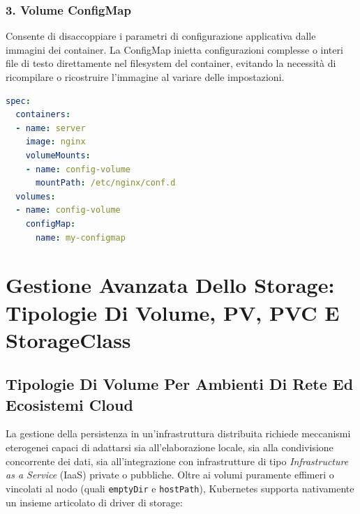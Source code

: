 \documentclass[11pt, a4paper]{article}
\begin{document}
\subsubsection{3. Volume ConfigMap}
Consente di disaccoppiare i parametri di configurazione applicativa dalle immagini dei container. La ConfigMap inietta configurazioni complesse o interi file di testo direttamente nel filesystem del container, evitando la necessità di ricompilare o ricostruire l'immagine al variare delle impostazioni.
\begin{lstlisting}[language=yaml, caption={Dichiarazione e montaggio di un volume basato su \texttt{configMap}.}]
spec:
  containers:
  - name: server
    image: nginx
    volumeMounts:
    - name: config-volume
      mountPath: /etc/nginx/conf.d
  volumes:
  - name: config-volume
    configMap:
      name: my-configmap
\end{lstlisting}


\section{Gestione Avanzata Dello Storage: Tipologie Di Volume, PV, PVC E StorageClass}

\subsection{Tipologie Di Volume Per Ambienti Di Rete Ed Ecosistemi Cloud}
La gestione della persistenza in un'infrastruttura distribuita richiede meccanismi eterogenei capaci di adattarsi sia all'elaborazione locale, sia alla condivisione concorrente dei dati, sia all'integrazione con infrastrutture di tipo \emph{Infrastructure as a Service} (IaaS) private o pubbliche. Oltre ai volumi puramente effimeri o vincolati al nodo (quali \texttt{emptyDir} e \texttt{hostPath}), Kubernetes supporta nativamente un insieme articolato di driver di storage:
\end{document}
